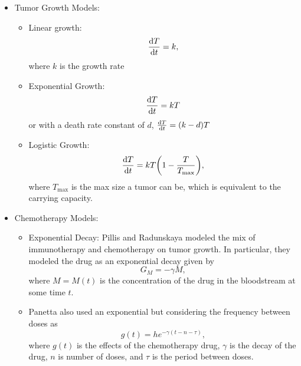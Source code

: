 \documentclass[11pt]{amsart}
\begin{document}
\begin{itemize}

	\item Tumor Growth Models:
		\begin{itemize}
	\item Linear growth: 
		\begin{equation}
			\frac{\mathop{}\!\mathrm{d} T}{\mathop{}\!\mathrm{d} t} = k,
			\label{eq: lin}
		\end{equation}
		where $k$ is the growth rate
	\item Exponential Growth:
		\begin{equation}
			\frac{\mathop{}\!\mathrm{d} T}{\mathop{}\!\mathrm{d} t} = kT \label{eq: exp}
		\end{equation}
	 or with a death rate constant of $d$, $\frac{\mathop{}\!\mathrm{d} T}{\mathop{}\!\mathrm{d} t} = (k-d)T$
	\item Logistic Growth: 
		\begin{equation}
			\frac{\mathop{}\!\mathrm{d} T}{\mathop{}\!\mathrm{d} t} = kT \biggl(1- \frac{T}{T_{\max}}\biggr)\label{eq: logistic},
		\end{equation}
		where $T_{\max}$ is the max size a tumor can be, which is equivalent to the carrying capacity.
		\end{itemize}
		
	\item Chemotherapy Models: 
		\begin{itemize}
			\item Exponential Decay: Pillis and Radunskaya modeled the mix of immunotherapy and chemotherapy on tumor growth. In particular, they modeled the drug as an exponential decay given by 
				\begin{equation}
					G_M = -\gamma M \label{eq: Pillis},
				\end{equation}
				where $M=M(t)$ is the concentration of the drug in the bloodstream at some time $t$.
				
			\item Panetta also used an exponential but considering the frequency between doses as
				\begin{equation}
					g(t) = h e^{-\gamma(t-n-\tau)} \label{eq:PanettaExpDec},
				\end{equation}
				where $g(t)$ is the effects of the chemotherapy drug, $\gamma$ is the decay of the drug, $n$ is number of doses, and $\tau$ is the period between doses.
				

\end{itemize}
\end{itemize}
\end{document}
